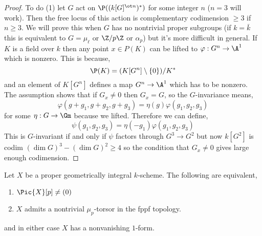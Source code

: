 \documentclass[12pt]{article}
\begin{document}
\begin{proof}
To do (1) let $G$ act on $\P((k[G]^{\ot n})^*)$ for some integer $n$ ($n = 3$ will work). Then the free locus of this action is complementary codimension $\ge 3$ if $n \ge 3$. We will prove this when $G$ has no nontrivial proper subgroups (if $k = \bar{k}$ this is equivalent to $G = \mu_\ell$ or $\Z / p \Z$ or $\alpha_p$) but it's more difficult in general. If $K$ is a field over $k$ then any point $x \in P(K)$ can be lifted to $\varphi : G^n \to \A^1$ which is nonzero. This is because,
\[ \P(K) = (K[G^n] \setminus \{ 0 \}) / K^* \]
and an element of $K[G^n]$ defines a map $G^n \to \A^1$ which has to be nonzero. The assumption shows that if $G_x \neq 0$ then $G_x = G$, so the $G$-invariance means,
\[ \varphi(g + g_1, g + g_2, g + g_3) = \eta(g) \varphi(g_1, g_2, g_3) \]
for some $\eta : G \to \Gm$ because we lifted. Therefore we can define,
\[ \psi(g_1, g_2, g_3) = \eta(-g_1) \varphi(g_1, g_2, g_3) \]
This is $G$-invariant if and only if $\psi$ factors through $G^3 \to G^2$ but now $k[G^2]$ is codim $(\dim{G})^3 - (\dim{G})^2 \ge 4$ so the condition that $G_x \neq 0$ gives large enough codimension.
\end{proof}

\begin{lemma}
Let $X$ be a proper geometrically integral $k$-scheme. The following are equivalent,
\begin{enumerate}
\item $\Pic{X}[p] \neq (0)$
\item $X$ admits a nontrivial $\mu_p$-torsor in the fppf topology.
\end{enumerate}
and in either case $X$ has a nonvanishing $1$-form.
\end{lemma}
\end{document}
